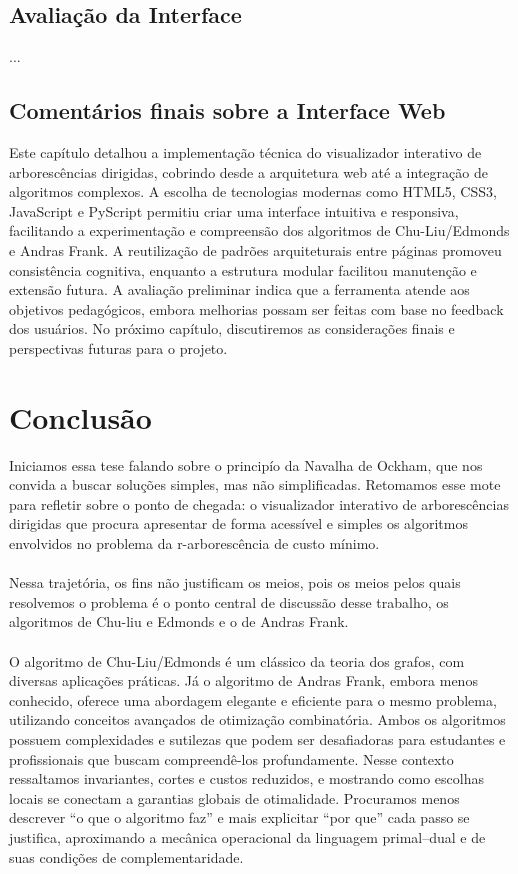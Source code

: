 \documentclass[12pt,a4paper]{article}
\begin{document}
\subsection{Avaliação da Interface}
...

\subsection{Comentários finais sobre a Interface Web}
Este capítulo detalhou a implementação técnica do visualizador interativo de arborescências dirigidas, cobrindo desde a arquitetura web até a integração de algoritmos complexos. A escolha de tecnologias modernas como HTML5, CSS3, JavaScript e PyScript permitiu criar uma interface intuitiva e responsiva, facilitando a experimentação e compreensão dos algoritmos de Chu-Liu/Edmonds e Andras Frank. A reutilização de padrões arquiteturais entre páginas promoveu consistência cognitiva, enquanto a estrutura modular facilitou manutenção e extensão futura. A avaliação preliminar indica que a ferramenta atende aos objetivos pedagógicos, embora melhorias possam ser feitas com base no feedback dos usuários. No próximo capítulo, discutiremos as considerações finais e perspectivas futuras para o projeto.

\section{Conclusão}
Iniciamos essa tese falando sobre o principío da Navalha de Ockham, que nos convida a buscar soluções simples, mas não simplificadas. Retomamos esse mote para refletir sobre o ponto de chegada: o visualizador interativo de arborescências dirigidas que procura apresentar de forma acessível e simples os algoritmos envolvidos no problema da r-arborescência de custo mínimo.

\paragraph{}
Nessa trajetória, os fins não justificam os meios, pois os meios pelos quais resolvemos o problema é o ponto central de discussão desse trabalho, os algoritmos de Chu-liu e Edmonds e o de Andras Frank.

\paragraph{}
O algoritmo de Chu-Liu/Edmonds é um clássico da teoria dos grafos, com diversas aplicações práticas. Já o algoritmo de Andras Frank, embora menos conhecido, oferece uma abordagem elegante e eficiente para o mesmo problema, utilizando conceitos avançados de otimização combinatória. Ambos os algoritmos possuem complexidades e sutilezas que podem ser desafiadoras para estudantes e profissionais que buscam compreendê-los profundamente. Nesse contexto ressaltamos invariantes, cortes e custos reduzidos, e mostrando como escolhas locais se conectam a garantias globais de otimalidade. Procuramos menos descrever “o que o algoritmo faz” e mais explicitar “por que” cada passo se justifica, aproximando a mecânica operacional da linguagem primal--dual e de suas condições de complementaridade.
\end{document}
